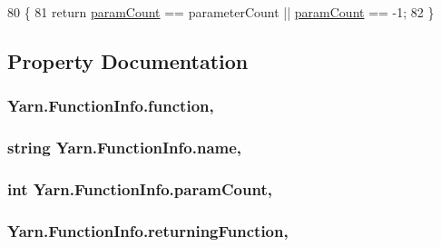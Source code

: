 \begin{DoxyCode}
80         \{
81             \textcolor{keywordflow}{return} \hyperlink{a00082_aa8527de9e4f153b05164ccaf167c3186}{paramCount} == parameterCount || \hyperlink{a00082_aa8527de9e4f153b05164ccaf167c3186}{paramCount} == -1;
82         \}
\end{DoxyCode}


\subsection{Property Documentation}
\hypertarget{a00082_a1dd2f9d11614a2fce170b3f3eecdb5f9}{
\subsubsection[{function}]{ Yarn.\-Function\-Info.\-function\hspace{0.3cm}{\ttfamily [get]}, {\ttfamily [set]}}}\label{a00082_a1dd2f9d11614a2fce170b3f3eecdb5f9}
\hypertarget{a00082_adb38e83e3c1597b553aeff14bef5bfcb}{
\subsubsection[{name}]{\setlength{\rightskip}{0pt plus 5cm}string Yarn.\-Function\-Info.\-name\hspace{0.3cm}{\ttfamily [get]}, {\ttfamily [set]}}}\label{a00082_adb38e83e3c1597b553aeff14bef5bfcb}
\hypertarget{a00082_aa8527de9e4f153b05164ccaf167c3186}{
\subsubsection[{param\-Count}]{\setlength{\rightskip}{0pt plus 5cm}int Yarn.\-Function\-Info.\-param\-Count\hspace{0.3cm}{\ttfamily [get]}, {\ttfamily [set]}}}\label{a00082_aa8527de9e4f153b05164ccaf167c3186}
\hypertarget{a00082_a8b6e0e5a875c427a1d947f3c52c308ca}{
\subsubsection[{returning\-Function}]{ Yarn.\-Function\-Info.\-returning\-Function\hspace{0.3cm}{\ttfamily [get]}, {\ttfamily [set]}}}\label{a00082_a8b6e0e5a875c427a1d947f3c52c308ca}
